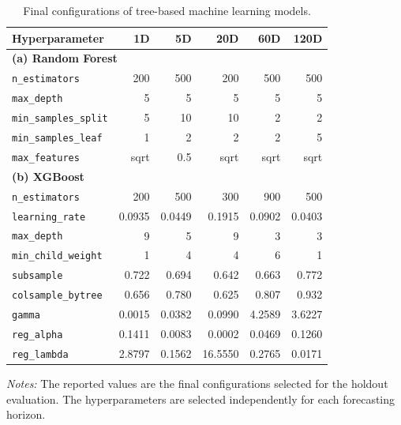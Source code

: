 \documentclass[12pt,twoside]{ord}
\begin{document}
\begin{table}[htbp]
\centering
\caption{Final configurations of tree-based machine learning models.}\label{tab:config_trees}
\setlength{\tabcolsep}{5pt}
\begin{tabular}{lrrrrr}
\hline
Hyperparameter & 1D & 5D & 20D & 60D & 120D \\
\hline
\multicolumn{6}{l}{\textbf{(a) Random Forest}} \\
\texttt{n\_estimators}      & 200    & 500    & 200    & 500    & 500 \\
\texttt{max\_depth}         & 5      & 5      & 5      & 5      & 5 \\
\texttt{min\_samples\_split}& 5      & 10     & 10     & 2      & 2 \\
\texttt{min\_samples\_leaf} & 1      & 2      & 2      & 2      & 5 \\
\texttt{max\_features}      & sqrt   & 0.5    & sqrt   & sqrt   & sqrt \\
\hline
\multicolumn{6}{l}{\textbf{(b) XGBoost}} \\
\texttt{n\_estimators}      & 200    & 500    & 300    & 900    & 500 \\
\texttt{learning\_rate}     & 0.0935 & 0.0449 & 0.1915 & 0.0902 & 0.0403 \\
\texttt{max\_depth}         & 9      & 5      & 9      & 3      & 3 \\
\texttt{min\_child\_weight} & 1      & 4      & 4      & 6      & 1 \\
\texttt{subsample}          & 0.722  & 0.694  & 0.642  & 0.663  & 0.772 \\
\texttt{colsample\_bytree}  & 0.656  & 0.780  & 0.625  & 0.807  & 0.932 \\
\texttt{gamma}              & 0.0015 & 0.0382 & 0.0990 & 4.2589 & 3.6227 \\
\texttt{reg\_alpha}         & 0.1411 & 0.0083 & 0.0002 & 0.0469 & 0.1260 \\
\texttt{reg\_lambda}        & 2.8797 & 0.1562 & 16.5550 & 0.2765 & 0.0171 \\
\hline
\end{tabular}
\par\vspace{4pt}\parbox{\linewidth}{\fontsize{9pt}{12pt}\selectfont\textit{Notes:} The reported values are the final configurations selected for the holdout evaluation. The hyperparameters are selected independently for each forecasting horizon.}
\end{table}
\end{document}
